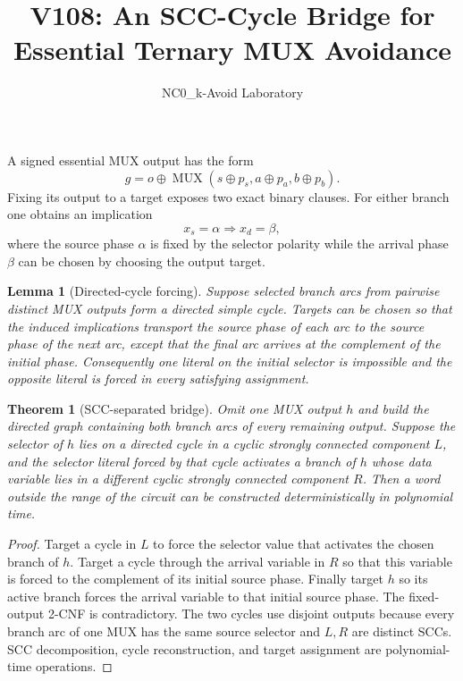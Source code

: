 \documentclass[11pt]{article}
\newtheorem{theorem}{Theorem}
\newtheorem{lemma}{Lemma}
\begin{document}
\title{V108: An SCC-Cycle Bridge for Essential Ternary MUX Avoidance}
\author{NC0\_k-Avoid Laboratory}
\date{}
\maketitle

A signed essential MUX output has the form
\[
 g=o\oplus \operatorname{MUX}(s\oplus p_s,a\oplus p_a,b\oplus p_b).
\]
Fixing its output to a target exposes two exact binary clauses.  For either
branch one obtains an implication
\[
 x_s=\alpha\Longrightarrow x_d=\beta,
\]
where the source phase $\alpha$ is fixed by the selector polarity while the
arrival phase $\beta$ can be chosen by choosing the output target.

\begin{lemma}[Directed-cycle forcing]
Suppose selected branch arcs from pairwise distinct MUX outputs form a directed
simple cycle.  Targets can be chosen so that the induced implications transport
the source phase of each arc to the source phase of the next arc, except that
the final arc arrives at the complement of the initial phase.  Consequently
one literal on the initial selector is impossible and the opposite literal is
forced in every satisfying assignment.
\end{lemma}

\begin{theorem}[SCC-separated bridge]
Omit one MUX output $h$ and build the directed graph containing both branch arcs
of every remaining output.  Suppose the selector of $h$ lies on a directed
cycle in a cyclic strongly connected component $L$, and the selector literal
forced by that cycle activates a branch of $h$ whose data variable lies in a
different cyclic strongly connected component $R$.  Then a word outside the
range of the circuit can be constructed deterministically in polynomial time.
\end{theorem}

\begin{proof}
Target a cycle in $L$ to force the selector value that activates the chosen
branch of $h$.  Target a cycle through the arrival variable in $R$ so that this
variable is forced to the complement of its initial source phase.  Finally
target $h$ so its active branch forces the arrival variable to that initial
source phase.  The fixed-output 2-CNF is contradictory.  The two cycles use
disjoint outputs because every branch arc of one MUX has the same source
selector and $L,R$ are distinct SCCs.  SCC decomposition, cycle reconstruction,
and target assignment are polynomial-time operations.
\end{proof}
\end{document}
